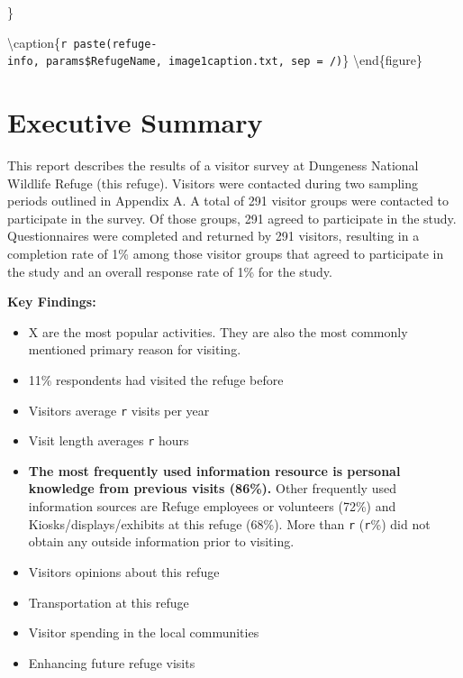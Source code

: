\documentclass[]{book}
\providecommand{\tightlist}{%
  \setlength{\itemsep}{0pt}\setlength{\parskip}{0pt}}
\begin{document}
\}

\textbackslash{}caption\{\texttt{r\ paste(\textquotesingle{}refuge-info\textquotesingle{},\ params\$RefugeName,\ \textquotesingle{}image1caption.txt\textquotesingle{},\ sep\ =\ \textquotesingle{}/\textquotesingle{})}\}\label{fig:ref-image1}
\textbackslash{}end\{figure\}

\chapter*{Executive Summary}\label{executive-summary}

This report describes the results of a visitor survey at Dungeness
National Wildlife Refuge (this refuge). Visitors were contacted during
two sampling periods outlined in Appendix A. A total of 291 visitor
groups were contacted to participate in the survey. Of those groups, 291
agreed to participate in the study. Questionnaires were completed and
returned by 291 visitors, resulting in a completion rate of 1\% among
those visitor groups that agreed to participate in the study and an
overall response rate of 1\% for the study.

\textbf{Key Findings:}

\begin{itemize}
\tightlist
\item
  X are the most popular activities. They are also the most commonly
  mentioned primary reason for visiting.
\item
  11\% respondents had visited the refuge before
\item
  Visitors average \texttt{r} visits per year
\item
  Visit length averages \texttt{r} hours
\item
  \textbf{The most frequently used information resource is personal
  knowledge from previous visits (86\%).} Other frequently used
  information sources are Refuge employees or volunteers (72\%) and
  Kiosks/displays/exhibits at this refuge (68\%). More than \texttt{r}
  (\texttt{r}\%) did not obtain any outside information prior to
  visiting.
\item
  Visitors opinions about this refuge
\item
  Transportation at this refuge
\item
  Visitor spending in the local communities
\item
  Enhancing future refuge visits
\end{itemize}
\end{document}
